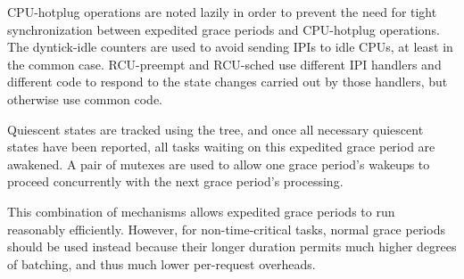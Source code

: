CPU-hotplug operations are noted lazily in order to prevent the need for
tight synchronization between expedited grace periods and CPU-hotplug
operations.
The dyntick-idle counters are used to avoid sending IPIs to
idle CPUs, at least in the common case. RCU-preempt and RCU-sched use
different IPI handlers and different code to respond to the state
changes carried out by those handlers, but otherwise use common code.

Quiescent states are tracked using the  tree, and once all
necessary quiescent states have been reported, all tasks waiting on this
expedited grace period are awakened.
A pair of mutexes are used to allow
one grace period's wakeups to proceed concurrently with the next grace
period's processing.

This combination of mechanisms allows expedited grace periods to run
reasonably efficiently.
However, for non-time-critical tasks, normal
grace periods should be used instead because their longer duration
permits much higher degrees of batching, and thus much lower per-request
overheads.
